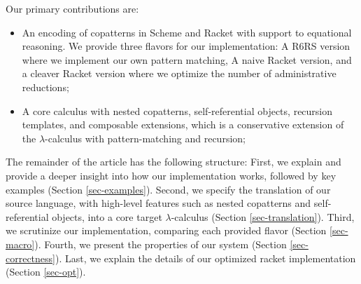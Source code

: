 Our primary contributions are:
\begin{itemize}
    \item An encoding of copatterns in Scheme and Racket with support to equational reasoning.
    We provide three flavors for our implementation: A R6RS version where we implement our own pattern matching, A naive Racket version, and a cleaver Racket version where we optimize the number of administrative reductions;
    \item A core calculus with nested copatterns, self-referential objects, recursion templates, and composable extensions, which is a conservative extension of the $\lambda$-calculus with pattern-matching and recursion;
\end{itemize} 

The remainder of the article has the following structure: First, we explain and provide a deeper insight into how our implementation works, followed by key examples (Section \ref{sec-examples}).
Second, we specify the translation of our source language, with high-level features such as nested copatterns and self-referential objects, into a core target $\lambda$-calculus (Section \ref{sec-translation}).
Third, we scrutinize our implementation, comparing each provided flavor (Section \ref{sec-macro}).
Fourth, we present the properties of our system (Section \ref{sec-correctness}).
Last, we explain the details of our optimized racket implementation (Section \ref{sec-opt}).



